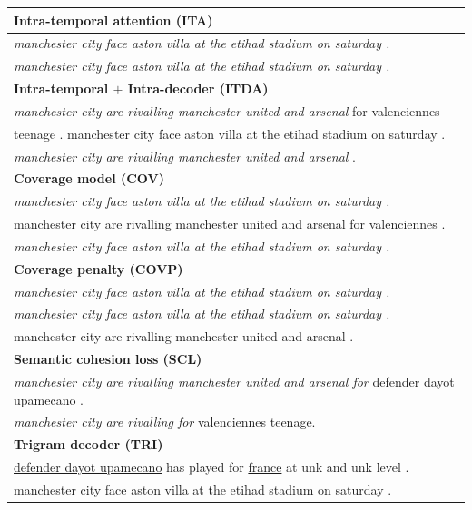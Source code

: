 \begin{table}[th!]
\begin{center}
\scriptsize
\begin{tabular}{|l|}%

\hline \bf Intra-temporal attention (ITA) \\
\hline \textit{manchester city face aston villa at the etihad stadium on saturday .} \\
	   \textit{manchester city face aston villa at the etihad stadium on saturday .}\\
\hline \bf Intra-temporal $+$ Intra-decoder (ITDA) \\
\hline \textit{manchester city are rivalling manchester united and arsenal }for valenciennes\\
       teenage . manchester city face aston villa at the etihad stadium on saturday . \\
	   \textit{manchester city are rivalling manchester united and arsenal }. \\
\hline \bf Coverage model (COV) \\
\hline \textit{manchester city face aston villa at the etihad stadium on saturday .} \\
       manchester city are rivalling manchester united and arsenal for valenciennes . \\
	   \textit{manchester city face aston villa at the etihad stadium on saturday .}\\
\hline \bf Coverage penalty (COVP)\\
\hline \textit{manchester city face aston villa at the etihad stadium on saturday .}\\
       \textit{manchester city face aston villa at the etihad stadium on saturday .}\\
	   manchester city are rivalling manchester united and arsenal .\\
\hline \bf Semantic cohesion loss (SCL) \\
\hline \textit{manchester city are rivalling manchester united and arsenal for } defender dayot upamecano . \\
       \textit{manchester city are rivalling for} valenciennes teenage. \\
\hline \bf Trigram decoder (TRI) \\
\hline \underline{defender dayot upamecano} has played for \underline{france} at unk and unk level .\\ 
       manchester city face aston villa at the etihad stadium on saturday . \\

\end{tabular}
\end{center}
\end{table}

